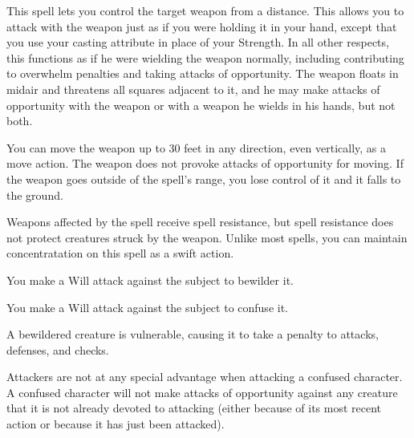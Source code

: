 \begin{spelleffect}
    This spell lets you control the target weapon from a distance. This allows you to attack with the weapon just as if you were holding it in your hand, except that you use your casting attribute in place of your Strength. In all other respects, this functions as if he were wielding the weapon normally, including contributing to overwhelm penalties and taking attacks of opportunity. The weapon floats in midair and threatens all squares adjacent to it, and he may make attacks of opportunity with the weapon or with a weapon he wields in his hands, but not both.

    You can move the weapon up to 30 feet in any direction, even vertically, as a move action. The weapon does not provoke attacks of opportunity for moving. If the weapon goes outside of the spell's range, you lose control of it and it falls to the ground.
\end{spelleffect}
\begin{spellnotes}
    Weapons affected by the spell receive spell resistance, but spell resistance does not protect creatures struck by the weapon. Unlike most spells, you can maintain concentratation on this spell as a swift action.
\end{spellnotes}

\begin{spellhealthy}
    You make a Will attack against the subject to bewilder it.
\end{spellhealthy}
\begin{spellblood}
    You make a Will attack against the subject to confuse it. \confusionexplanation
\end{spellblood}
\begin{spellnotes}
    A bewildered creature is vulnerable, causing it to take a  penalty to attacks, defenses, and checks.
    \par Attackers are not at any special advantage when attacking a confused character. A confused character will not make attacks of opportunity against any creature that it is not already devoted to attacking (either because of its most recent action or because it has just been attacked).
\end{spellnotes}

